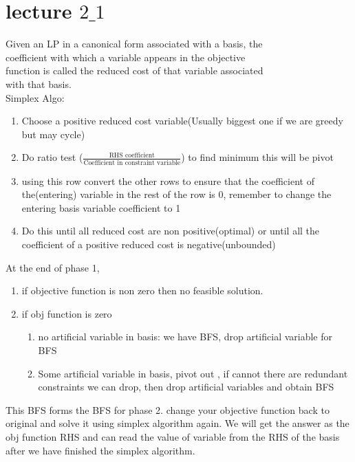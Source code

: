 \documentclass{article}
\begin{document}
\section{lecture $2\_1$}
Given an LP in a canonical form associated with a basis, the\\
coefficient with which a variable appears in the objective\\
function is called the reduced cost of that variable associated\\
with that basis.\\

Simplex Algo:
\begin{enumerate}
  \item Choose a positive reduced cost variable(Usually biggest one if we are greedy but may cycle)
  \item Do ratio test ($\frac{\text{RHS coefficient}}{\text{Coefficient in constraint variable}} $) to find minimum this will be pivot
  \item using this row convert the other rows to ensure that the coefficient of the(entering) variable in the rest of the row is 0, remember to change the entering basis variable coefficient to 1
  \item Do this until all reduced cost are non positive(optimal) or until all the coefficient of a positive reduced cost is negative(unbounded)
\end{enumerate}
At the end of phase 1,
\begin{enumerate}
  \item if objective function is non zero then no feasible solution.\\
  \item if obj function is zero\\
    \begin{enumerate}
      \item no artificial variable in basis: we have BFS, drop artificial variable for BFS
      \item Some artificial variable in basis, pivot out , if cannot there are redundant constraints we can drop, then drop artificial variables and obtain BFS
    \end{enumerate}
\end{enumerate}
This BFS forms the BFS for phase 2. change your objective function back to original and solve it using simplex algorithm again.
We will get the answer as the obj function RHS and can read the value of variable from the RHS of the basis after we have finished the simplex algorithm.\\
\end{document}
